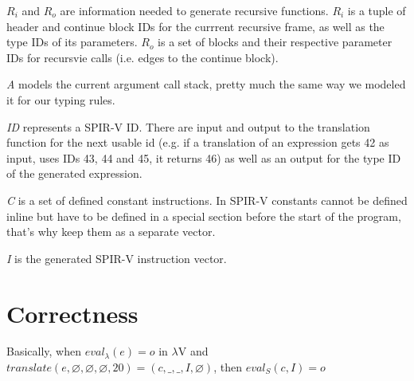 \documentclass[letterpaper,12pt]{article}
\begin{document}
$R_i$ and $R_o$ are information needed to generate recursive
functions. $R_i$ is a tuple of header and continue block IDs for
the currrent recursive frame, as well as the type IDs of its parameters.
$R_o$ is a set of blocks and their respective parameter IDs for
recursvie calls (i.e. edges to the continue block).

\textit{A} models the current argument call stack, pretty much the same
way we modeled it for our typing rules.

\textit{ID} represents a SPIR-V ID. There are input and output to the 
translation function for the next usable id (e.g. if a translation of an
expression gets 42 as input, uses IDs 43, 44 and 45, it returns 46)
as well as an output for the type ID of the generated expression.

\textit{C} is a set of defined constant instructions. In SPIR-V constants
cannot be defined inline but have to be defined in a special section before
the start of the program, that's why keep them as a separate vector.

\textit{I} is the generated SPIR-V instruction vector.

\section{Correctness}

Basically, when $eval_\lambda(e) = o$ in $\lambda$V and 
$translate(e, \varnothing, \varnothing, \varnothing, 20) = (c, \_, \_, I, \varnothing)$,
then $eval_S(c, I) = o$
\end{document}
